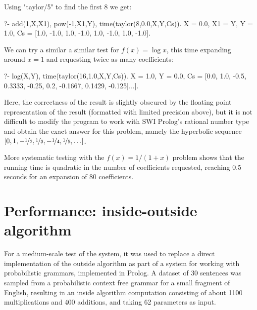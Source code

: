 Using "taylor/5" to find the first 8 we get:
\begin{prolog-barred}
	?- add(1,X,X1), pow(-1,X1,Y), time(taylor(8,0.0,X,Y,Cs)).
	X = 0.0,
	X1 = Y, Y = 1.0,
	Cs = [1.0, -1.0, 1.0, -1.0, 1.0, -1.0, 1.0, -1.0].
\end{prolog-barred}
We can try a similar a similar test for $f(x) = \log x$, this
time expanding around $x=1$ and requesting twice as many coefficients:
\begin{prolog-barred}
	?- log(X,Y), time(taylor(16,1.0,X,Y,Cs)).
	X = 1.0,
	Y = 0.0,
	Cs = [0.0, 1.0, -0.5, 0.3333, -0.25, 0.2, -0.1667, 0.1429, -0.125|...].
\end{prolog-barred}
Here, the correctness of the result is slightly obscured by the
floating point representation of the result (formatted with limited precision above), 
but it is not difficult to 
modify the program to work with SWI Prolog's rational
number type and obtain the exact answer for this problem, namely the
hyperbolic sequence $[0, 1, -\nf(1,2), \nf(1,3), -\nf(1,4), \nf(1,5), \ldots]$.

More systematic testing with the $f(x)=1/(1+x)$ problem shows that the running
time is quadratic in the number of coefficients requested, 
reaching 0.5 seconds for an expansion of 80 coefficients.


\section{Performance: inside-outside algorithm}

For a medium-scale test of the system, it was used to replace a
direct implementation of the outside algorithm as part of a 
system for working with probabilistic grammars, implemented in Prolog.
A dataset of 30 sentences was sampled from a probabilistic context
free grammar for a small fragment of English, resulting in an inside algorithm
computation consisting of about 1100 multiplications and 400 additions, and
taking 62 parameters as input.

